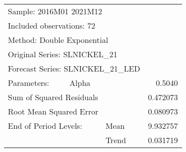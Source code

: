 \begin{tabular}{lrrrr}
\toprule
\multicolumn{3}{l}{Sample: 2016M01 2021M12}&\multicolumn{1}{c}{}&\multicolumn{1}{c}{}\\
\multicolumn{3}{l}{Included observations: 72}&\multicolumn{1}{c}{}&\multicolumn{1}{c}{}\\
\multicolumn{3}{l}{Method: Double Exponential}&\multicolumn{1}{c}{}&\multicolumn{1}{c}{}\\
\multicolumn{3}{l}{Original Series: SLNICKEL\_21}&\multicolumn{1}{c}{}&\multicolumn{1}{c}{}\\
\multicolumn{4}{l}{Forecast Series: SLNICKEL\_21\_LED}&\multicolumn{1}{c}{}\\
\midrule
\multicolumn{1}{l}{Parameters:}&\multicolumn{1}{l}{Alpha}&\multicolumn{1}{c}{}&\multicolumn{1}{c}{}&\multicolumn{1}{r}{0.5040}\\
\multicolumn{3}{l}{Sum of Squared Residuals}&\multicolumn{1}{c}{}&\multicolumn{1}{r}{0.472073}\\
\multicolumn{3}{l}{Root Mean Squared Error}&\multicolumn{1}{c}{}&\multicolumn{1}{r}{0.080973}\\
\midrule
\multicolumn{2}{l}{End of Period Levels:}&\multicolumn{1}{l}{Mean}&\multicolumn{1}{c}{}&\multicolumn{1}{r}{9.932757}\\
\multicolumn{1}{c}{}&\multicolumn{1}{c}{}&\multicolumn{1}{l}{Trend}&\multicolumn{1}{c}{}&\multicolumn{1}{r}{0.031719}\\
\bottomrule
\end{tabular}

